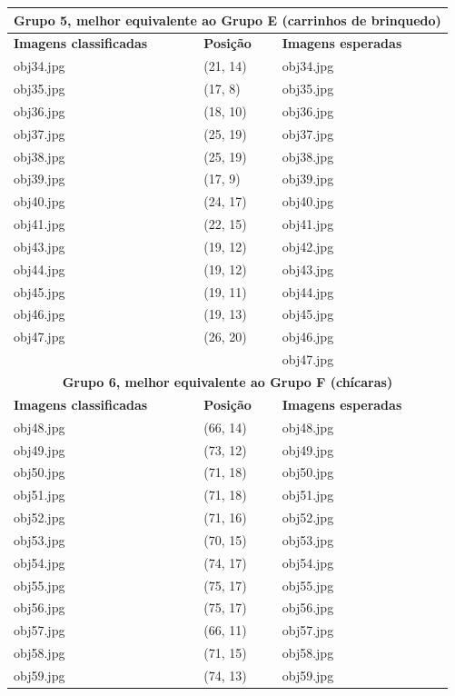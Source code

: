 \begin{center}
\begin{longtable}{|l|l|l|}
    \multicolumn{3}{|c|}{\textbf{Grupo 5, melhor equivalente ao Grupo E
      (carrinhos de brinquedo)}} \\
    \hline\hline
    \textbf{Imagens classificadas} & \textbf{Posição} & \textbf{Imagens esperadas} \\
    \hline\hline

    obj34.jpg & (21, 14) & obj34.jpg \\
    \hline
    obj35.jpg & (17, 8)  & obj35.jpg \\
    \hline
    obj36.jpg & (18, 10) & obj36.jpg \\
    \hline
    obj37.jpg & (25, 19) & obj37.jpg \\
    \hline
    obj38.jpg & (25, 19) & obj38.jpg \\
    \hline
    obj39.jpg & (17, 9)  & obj39.jpg \\
    \hline
    obj40.jpg & (24, 17) & obj40.jpg \\
    \hline
    obj41.jpg & (22, 15) & obj41.jpg \\
    \hline
    obj43.jpg & (19, 12) & obj42.jpg \\
    \hline
    obj44.jpg & (19, 12) & obj43.jpg \\
    \hline
    obj45.jpg & (19, 11) & obj44.jpg \\
    \hline
    obj46.jpg & (19, 13) & obj45.jpg \\
    \hline
    obj47.jpg & (26, 20) & obj46.jpg \\
    \hline
    & & obj47.jpg \\
    \hline\hline

    \multicolumn{3}{|c|}{\textbf{Grupo 6, melhor equivalente ao Grupo F
      (chícaras)}} \\
    \hline\hline
    \textbf{Imagens classificadas} & \textbf{Posição} & \textbf{Imagens esperadas} \\
    \hline\hline

    obj48.jpg & (66, 14) & obj48.jpg \\
    \hline
    obj49.jpg & (73, 12) & obj49.jpg \\
    \hline
    obj50.jpg & (71, 18) & obj50.jpg \\
    \hline
    obj51.jpg & (71, 18) & obj51.jpg \\
    \hline
    obj52.jpg & (71, 16) & obj52.jpg \\
    \hline
    obj53.jpg & (70, 15) & obj53.jpg \\
    \hline
    obj54.jpg & (74, 17) & obj54.jpg \\
    \hline
    obj55.jpg & (75, 17) & obj55.jpg \\
    \hline
    obj56.jpg & (75, 17) & obj56.jpg \\
    \hline
    obj57.jpg & (66, 11) & obj57.jpg \\
    \hline
    obj58.jpg & (71, 15) & obj58.jpg \\
    \hline
    obj59.jpg & (74, 13) & obj59.jpg \\
    \hline\hline


\end{longtable}
\end{center}
